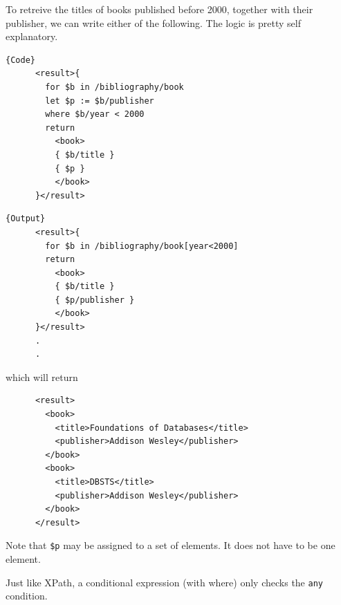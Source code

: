   \begin{example}
    \label{ex:flwor-with-loops-and-conditionals}
    To retreive the titles of books published before 2000, together with their publisher, we can write either of the following. The logic is pretty self explanatory. 

    \noindent\begin{minipage}{.5\textwidth}
    \begin{lstlisting}[]{Code}
      <result>{
        for $b in /bibliography/book 
        let $p := $b/publisher 
        where $b/year < 2000 
        return 
          <book>
          { $b/title }
          { $p }
          </book>
      }</result>
    \end{lstlisting}
    \end{minipage}
    \hfill
    \begin{minipage}{.49\textwidth}
    \begin{lstlisting}[]{Output}
      <result>{
        for $b in /bibliography/book[year<2000]
        return 
          <book>
          { $b/title }
          { $p/publisher }
          </book>
      }</result>
      .
      .
    \end{lstlisting}
    \end{minipage}
    which will return 
    \begin{lstlisting}
      <result>
        <book>
          <title>Foundations of Databases</title>
          <publisher>Addison Wesley</publisher>
        </book>
        <book>
          <title>DBSTS</title>
          <publisher>Addison Wesley</publisher>
        </book>
      </result> 
    \end{lstlisting}
    Note that \texttt{\$p} may be assigned to a set of elements. It does not have to be one element. 
  \end{example}

  Just like XPath, a conditional expression (with where) only checks the \texttt{any} condition. 
  
